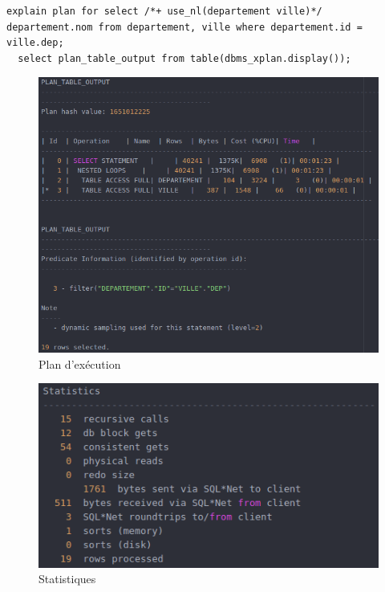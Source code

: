 \documentclass[a4paper,12pt]{article}
\begin{document}
\begin{lstlisting}[caption={requêtes permettant d'expliquer le plan d'exécution affichant le nom du département pour toutes les villes, en forçant l'utilisation de l'algorithme de jointure Nested Loops}, label={lst:question_8}]
  explain plan for select /*+ use_nl(departement ville)*/ departement.nom from departement, ville where departement.id = ville.dep;
  select plan_table_output from table(dbms_xplan.display());
\end{lstlisting}

\begin{figure}[!ht]
  \centering
  \includegraphics[scale=0.6]{images/q8_1.png}
  \caption{Plan d'exécution}
\end{figure}

\begin{figure}[!ht]
  \centering
  \includegraphics[scale=0.6]{images/q8_2.png}
  \caption{Statistiques}
  \label{fig:q8_2}
\end{figure}
\end{document}
